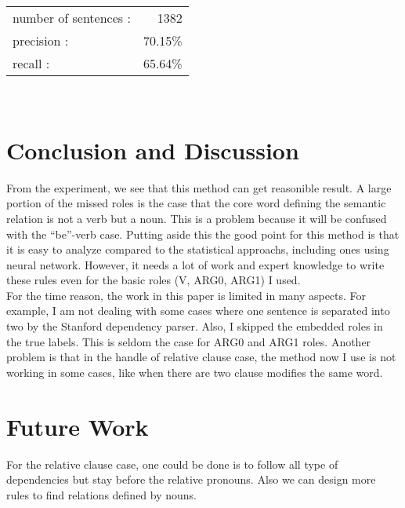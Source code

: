\documentclass[letterpaper]{article}
\begin{document}
\begin{tabular}{l r}
	number of sentences :	& 1382 \\
	precision : 			& 70.15\% \\
	recall : 				& 65.64\% \\
\end{tabular}\\





\section{Conclusion and Discussion}

From the experiment, we see that this method can get reasonible result. A large portion of the missed roles is the case that the core word defining the semantic relation is not a verb but a noun. This is a problem because it will be confused with the ``be''-verb case. Putting aside this the good point for this method is that it is easy to analyze compared to the statistical approachs, including ones using neural network. However, it needs a lot of work and expert knowledge to write these rules even for the basic roles (V, ARG0, ARG1) I used.\\

For the time reason, the work in this paper is limited in many aspects. For example, I am not dealing with some cases where one sentence is separated into two by the Stanford dependency parser. Also, I skipped the embedded roles in the true labels. This is seldom the case for ARG0 and ARG1 roles. Another problem is that in the handle of relative clause case, the method now I use is not working in some cases, like when there are two clause modifies the same word.


\section{Future Work}
For the relative clause case, one could be done is to follow all type of dependencies but stay before the relative pronouns. Also we can design more rules to find relations defined by nouns.




\newpage
\end{document}
